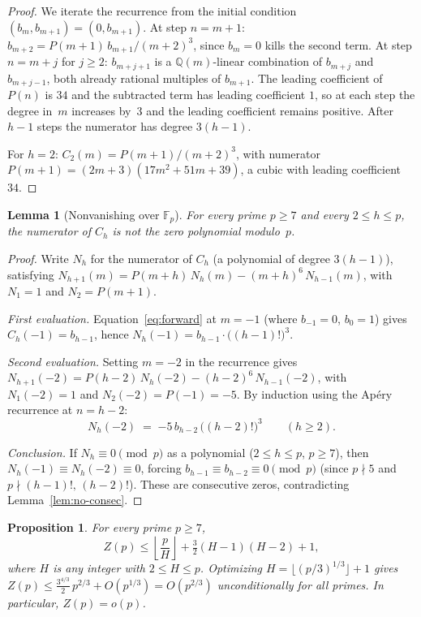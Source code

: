 \documentclass[11pt]{article}
\newtheorem{lemma}[theorem]{Lemma}
\newtheorem{proposition}[theorem]{Proposition}
\theoremstyle{definition}
\theoremstyle{remark}
\begin{document}
\begin{proof}
We iterate the recurrence from the initial condition
$(b_m, b_{m+1}) = (0, b_{m+1})$.
At step $n = m + 1$:
$b_{m+2} = P(m+1)\,b_{m+1}/(m+2)^3$,
since $b_m = 0$ kills the second term.
At step $n = m + j$ for $j \ge 2$:
$b_{m+j+1}$ is a $\mathbb{Q}(m)$-linear combination
of $b_{m+j}$ and $b_{m+j-1}$, both already
rational multiples of $b_{m+1}$.
The leading coefficient of $P(n)$ is $34$ and
the subtracted term has leading coefficient $1$,
so at each step the degree in~$m$ increases by~$3$
and the leading coefficient remains positive.
After $h - 1$ steps the numerator has degree
$3(h-1)$.

For $h = 2$: $C_2(m) = P(m+1)/(m+2)^3$,
with numerator $P(m+1) = (2m+3)(17m^2+51m+39)$,
a cubic with leading coefficient~$34$.
\end{proof}

\begin{lemma}[Nonvanishing over $\mathbb{F}_p$]\label{lem:nonvanish}
For every prime $p \ge 7$ and every $2 \le h \le p$,
the numerator of $C_h$ is not the zero polynomial
modulo~$p$.
\end{lemma}

\begin{proof}
Write $N_h$ for the numerator of $C_h$ (a polynomial of degree $3(h-1)$),
satisfying
$N_{h+1}(m) = P(m{+}h)\,N_h(m) - (m{+}h)^6\,N_{h-1}(m)$,
with $N_1 = 1$ and $N_2 = P(m{+}1)$.

\emph{First evaluation.}
Equation~\eqref{eq:forward} at $m = -1$ (where $b_{-1} = 0$, $b_0 = 1$)
gives $C_h(-1) = b_{h-1}$, hence
$N_h(-1) = b_{h-1}\cdot\bigl((h{-}1)!\bigr)^3$.

\emph{Second evaluation.}
Setting $m = -2$ in the recurrence gives
$N_{h+1}(-2) = P(h{-}2)\,N_h(-2) - (h{-}2)^6\,N_{h-1}(-2)$,
with $N_1(-2) = 1$ and $N_2(-2) = P(-1) = -5$.
By induction using the Apéry recurrence at $n = h - 2$:
\begin{equation}\label{eq:eval-minus2}
N_h(-2) \;=\; {-5}\,b_{h-2}\,\bigl((h{-}2)!\bigr)^3
\qquad (h \ge 2).
\end{equation}

\emph{Conclusion.}
If $N_h \equiv 0 \pmod{p}$ as a polynomial
($2 \le h \le p$, $p \ge 7$),
then $N_h(-1) \equiv N_h(-2) \equiv 0$,
forcing $b_{h-1} \equiv b_{h-2} \equiv 0 \pmod{p}$
(since $p \nmid 5$ and $p \nmid (h{-}1)!,\,(h{-}2)!$).
These are consecutive zeros, contradicting
Lemma~\ref{lem:no-consec}.
\end{proof}

\begin{proposition}\label{prop:zp-bound}
For every prime $p \ge 7$,
\begin{equation}\label{eq:effective}
Z(p) \le \left\lfloor\frac{p}{H}\right\rfloor
+ \tfrac{3}{2}(H-1)(H-2) + 1,
\end{equation}
where $H$ is any integer with $2 \le H \le p$.
Optimizing $H = \lfloor(p/3)^{1/3}\rfloor + 1$ gives
$Z(p) \le \frac{3^{4/3}}{2}\,p^{2/3} + O(p^{1/3})
= O(p^{2/3})$
unconditionally for all primes.
In particular, $Z(p) = o(p)$.
\end{proposition}
\end{document}
